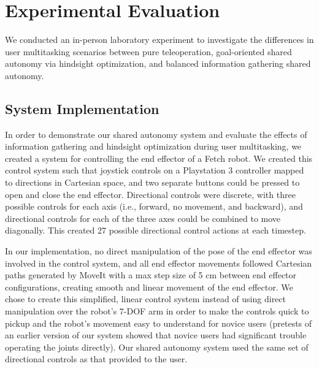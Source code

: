 \documentclass[conference]{IEEEtran}
\begin{document}
\section{Experimental Evaluation}

We conducted an in-person laboratory experiment to investigate the differences in user multitasking scenarios between pure teleoperation, goal-oriented shared autonomy via hindsight optimization, and balanced information gathering shared autonomy.

\subsection{System Implementation}\label{implementation}
In order to demonstrate our shared autonomy system and evaluate the effects of information gathering and hindsight optimization during user multitasking, we created a system for controlling the end effector of a Fetch robot. We created this control system such that joystick controls on a Playstation 3 controller mapped to directions in Cartesian space, and two separate buttons could be pressed to open and close the end effector. Directional controls were discrete, with three possible controls for each axis (i.e., forward, no movement, and backward), and directional controls for each of the three axes could be combined to move diagonally. This created 27 possible directional control actions at each timestep.

In our implementation, no direct manipulation of the pose of the end effector was involved in the control system, and all end effector movements followed Cartesian paths generated by MoveIt \cite{sucan2013moveit} with a max step size of 5 cm between end effector configurations, creating smooth and linear movement of the end effector. We chose to create this simplified, linear control system instead of using direct manipulation over the robot's 7-DOF arm in order to make the controls quick to pickup and the robot's movement easy to understand for novice users (pretests of an earlier version of our system showed that novice users had significant trouble operating the joints directly). Our shared autonomy system used the same set of directional controls as that provided to the user.
\end{document}
